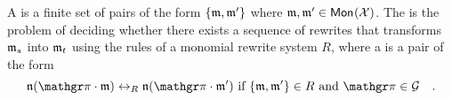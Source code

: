 \begin{definition}
  \label{def:mon-rewrite-system}
  A  is a finite set of pairs of the form
  $\set{\monelt, \monelt'}$ where $\monelt, \monelt' \in \mon{\Indets}$.
  The  is the problem of deciding whether
  there exists a sequence of rewrites that transforms $\monelt_s$ into $\monelt_t$
  using the rules of a monomial rewrite system $R$, where
  a  is a pair of the form
  \begin{equation*}
    \monelt[n] (\gelem \cdot \monelt)
    \leftrightarrow_R 
    \monelt[n] (\gelem \cdot \monelt')
    \text{ if } \set{\monelt, \monelt'} \in R
    \text{ and } \gelem \in \group
    \quad .
  \end{equation*}
\end{definition}


